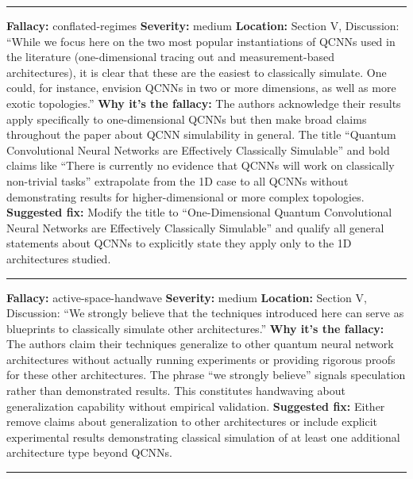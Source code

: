 \documentclass[10pt,letterpaper]{article}
\begin{document}
\begin{center}\rule{0.5\linewidth}{0.5pt}\end{center}

\textbf{Fallacy:} conflated-regimes
\textbf{Severity:} medium
\textbf{Location:} Section V, Discussion: ``While we focus here on the two most popular instantiations of QCNNs used in the literature (one-dimensional tracing out and measurement-based architectures), it is clear that these are the easiest to classically simulate. One could, for instance, envision QCNNs in two or more dimensions, as well as more exotic topologies.''
\textbf{Why it's the fallacy:} The authors acknowledge their results apply specifically to one-dimensional QCNNs but then make broad claims throughout the paper about QCNN simulability in general. The title ``Quantum Convolutional Neural Networks are Effectively Classically Simulable'' and bold claims like ``There is currently no evidence that QCNNs will work on classically non-trivial tasks'' extrapolate from the 1D case to all QCNNs without demonstrating results for higher-dimensional or more complex topologies.
\textbf{Suggested fix:} Modify the title to ``One-Dimensional Quantum Convolutional Neural Networks are Effectively Classically Simulable'' and qualify all general statements about QCNNs to explicitly state they apply only to the 1D architectures studied.

\begin{center}\rule{0.5\linewidth}{0.5pt}\end{center}

\textbf{Fallacy:} active-space-handwave
\textbf{Severity:} medium
\textbf{Location:} Section V, Discussion: ``We strongly believe that the techniques introduced here can serve as blueprints to classically simulate other architectures.''
\textbf{Why it's the fallacy:} The authors claim their techniques generalize to other quantum neural network architectures without actually running experiments or providing rigorous proofs for these other architectures. The phrase ``we strongly believe'' signals speculation rather than demonstrated results. This constitutes handwaving about generalization capability without empirical validation.
\textbf{Suggested fix:} Either remove claims about generalization to other architectures or include explicit experimental results demonstrating classical simulation of at least one additional architecture type beyond QCNNs.

\begin{center}\rule{0.5\linewidth}{0.5pt}\end{center}
\end{document}
